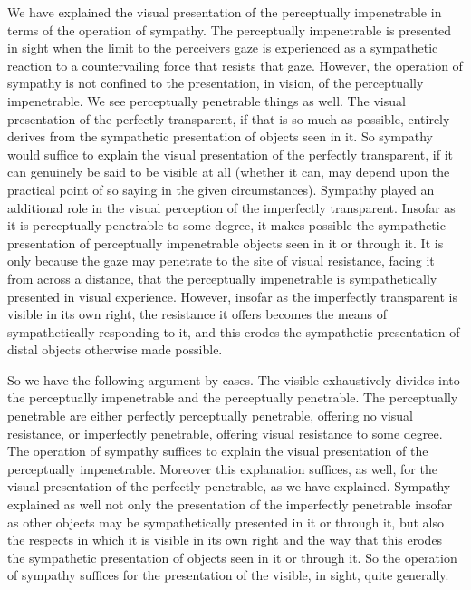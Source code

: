 We have explained the visual presentation of the perceptually impenetrable in terms of the operation of sympathy. The perceptually impenetrable is presented in sight when the limit to the perceivers gaze is experienced as a sympathetic reaction to a countervailing force that resists that gaze. However, the operation of sympathy is not confined to the presentation, in vision, of the perceptually impenetrable. We see perceptually penetrable things as well. The visual presentation of the perfectly transparent, if that is so much as possible, entirely derives from the sympathetic presentation of objects seen in it. So sympathy would suffice to explain the visual presentation of the perfectly transparent, if it can genuinely be said to be visible at all (whether it can, may depend upon the practical point of so saying in the given circumstances). Sympathy played an additional role in the visual perception of the imperfectly transparent. Insofar as it is perceptually penetrable to some degree, it makes possible the sympathetic presentation of perceptually impenetrable objects seen in it or through it. It is only because the gaze may penetrate to the site of visual resistance, facing it from across a distance, that the perceptually impenetrable is sympathetically presented in visual experience. However, insofar as the imperfectly transparent is visible in its own right, the resistance it offers becomes the means of sympathetically responding to it, and this erodes the sympathetic presentation of distal objects otherwise made possible. 

So we have the following argument by cases. The visible exhaustively divides into the perceptually impenetrable and the perceptually penetrable. The perceptually penetrable are either perfectly perceptually penetrable, offering no visual resistance, or imperfectly penetrable, offering visual resistance to some degree. The operation of sympathy suffices to explain the visual presentation of the perceptually impenetrable. Moreover this explanation suffices, as well, for the visual presentation of the perfectly penetrable, as we have explained. Sympathy explained as well not only the presentation of the imperfectly penetrable insofar as other objects may be sympathetically presented in it or through it, but also the respects in which it is visible in its own right and the way that this erodes the sympathetic presentation of objects seen in it or through it. So the operation of sympathy suffices for the presentation of the visible, in sight, quite generally.

